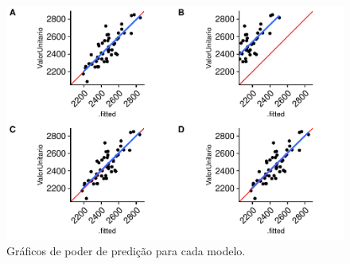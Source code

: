 \documentclass[
  a4paper, 12pt]{article}
\begin{document}
\begin{figure}[H]

{\centering \includegraphics[width=1\linewidth]{EstudoCaso_files/figure-latex/powerPlots-1} 

}

\caption{Gráficos de poder de predição para cada modelo.}\label{fig:powerPlots}
\end{figure}
\end{document}
